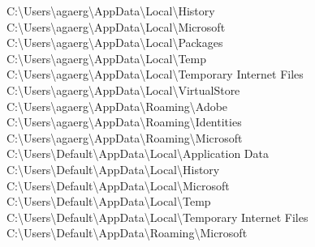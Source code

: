 C:\textbackslash Users\textbackslash agaerg\textbackslash AppData\textbackslash Local\textbackslash History \\
C:\textbackslash Users\textbackslash agaerg\textbackslash AppData\textbackslash Local\textbackslash Microsoft \\
C:\textbackslash Users\textbackslash agaerg\textbackslash AppData\textbackslash Local\textbackslash Packages \\
C:\textbackslash Users\textbackslash agaerg\textbackslash AppData\textbackslash Local\textbackslash Temp \\
C:\textbackslash Users\textbackslash agaerg\textbackslash AppData\textbackslash Local\textbackslash Temporary Internet Files \\
C:\textbackslash Users\textbackslash agaerg\textbackslash AppData\textbackslash Local\textbackslash VirtualStore \\
C:\textbackslash Users\textbackslash agaerg\textbackslash AppData\textbackslash Roaming\textbackslash Adobe \\
C:\textbackslash Users\textbackslash agaerg\textbackslash AppData\textbackslash Roaming\textbackslash Identities \\
C:\textbackslash Users\textbackslash agaerg\textbackslash AppData\textbackslash Roaming\textbackslash Microsoft \\
C:\textbackslash Users\textbackslash Default\textbackslash AppData\textbackslash Local\textbackslash Application Data \\
C:\textbackslash Users\textbackslash Default\textbackslash AppData\textbackslash Local\textbackslash History \\
C:\textbackslash Users\textbackslash Default\textbackslash AppData\textbackslash Local\textbackslash Microsoft \\
C:\textbackslash Users\textbackslash Default\textbackslash AppData\textbackslash Local\textbackslash Temp \\
C:\textbackslash Users\textbackslash Default\textbackslash AppData\textbackslash Local\textbackslash Temporary Internet Files \\
C:\textbackslash Users\textbackslash Default\textbackslash AppData\textbackslash Roaming\textbackslash Microsoft \\
